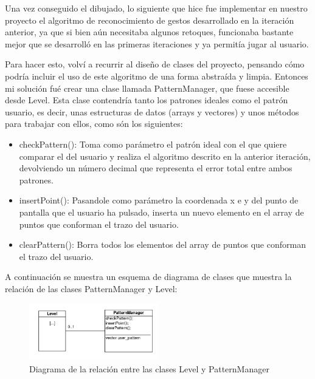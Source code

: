 \vspace{0.5cm}

Una vez conseguido el dibujado, lo siguiente que hice fue implementar en nuestro proyecto el algoritmo de reconocimiento de gestos desarrollado en la iteración anterior, ya que si bien aún necesitaba algunos retoques, funcionaba bastante mejor que se desarrolló en las primeras iteraciones y ya permitía jugar al usuario.

\vspace{0.5cm}

Para hacer esto, volví a recurrir al diseño de clases del proyecto, pensando cómo podría incluir el uso de este algoritmo de una forma abstraída y limpia. Entonces mi solución fué crear una clase llamada PatternManager, que fuese accesible desde Level. Esta clase contendría tanto los patrones ideales como el patrón usuario, es decir, unas estructuras de datos (arrays y vectores) y unos métodos para trabajar con ellos, como són los siguientes:

\vspace{0.5cm}

\begin{itemize}
 \item checkPattern(): Toma como parámetro el patrón ideal con el que quiere comparar el del usuario y realiza el algoritmo descrito en la anterior iteración, devolviendo un número decimal que representa el error total entre ambos patrones.
 \item insertPoint(): Pasandole como parámetro la coordenada x e y del punto de pantalla que el usuario ha pulsado, inserta un nuevo elemento en el array de puntos que conforman el trazo del usuario.
 \item clearPattern(): Borra todos los elementos del array de puntos que conforman el trazo del usuario.
\end{itemize}

A continuación se muestra un esquema de diagrama de clases que muestra la relación de las clases PatternManager y Level:

\vspace{0.5cm}

\begin{figure}[htbp]
\centering
  \includegraphics[width=0.5\textwidth]{archivos/diagram_patternmanager.png}
  \caption{Diagrama de la relación entre las clases Level y PatternManager}
  \label{fig:diagram_patternmanager}
\end{figure}

